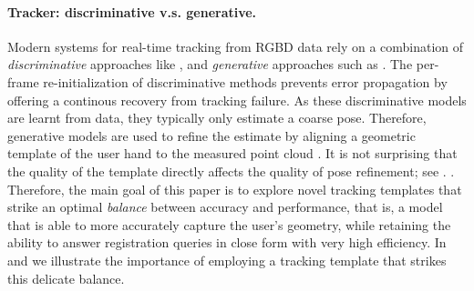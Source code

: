 \paragraph{Tracker: discriminative v.s. generative.}
Modern systems for real-time tracking from RGBD data  \cite{sridhar2015fast,sharp2015accurate} rely on a combination of \emph{discriminative} approaches like \cite{oberweger2015feedback}, and \emph{generative} approaches such as \cite{tagliasacchi2015robust}. The per-frame re-initialization of discriminative methods prevents error propagation by offering a continous recovery from tracking failure. As these discriminative models are learnt from data, they typically only estimate a coarse pose. Therefore, generative models are used to refine the estimate by aligning a geometric template of the user hand to the measured point cloud . It is not surprising that the quality of the template directly affects the quality of pose refinement; see . 
.
% 
Therefore, the main goal of this paper is to explore novel tracking templates that strike an optimal \emph{balance} between accuracy and performance, that is, a model that is able to more accurately capture the user's geometry, while retaining the ability to answer registration queries in close form with very high efficiency. In  and  we illustrate the importance of employing a tracking template that strikes this delicate balance.



